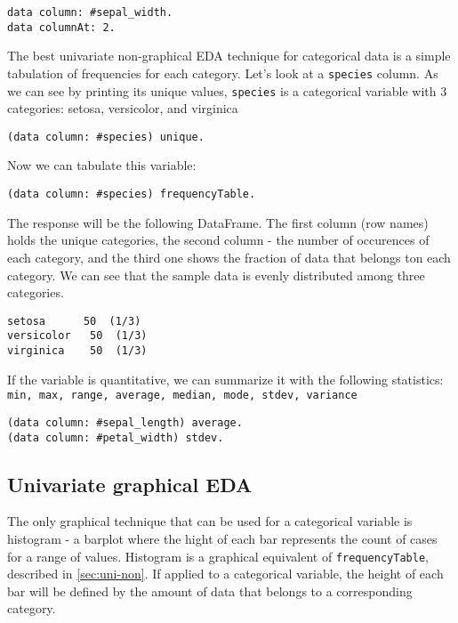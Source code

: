 \documentclass[sigplan]{acmart}
\begin{document}
\begin{lstlisting}[basicstyle=\small,language=Smalltalk]
data column: #sepal_width.
data columnAt: 2.
\end{lstlisting}

The best univariate non-graphical EDA technique for categorical data is a simple tabulation of frequencies for each category\cite{Seltman}. Let's look at a \texttt{species} column. As we can see by printing its unique values, \texttt{species} is a categorical variable with 3 categories: setosa, versicolor, and virginica

\begin{lstlisting}[basicstyle=\small,language=Smalltalk]
(data column: #species) unique.
\end{lstlisting}

Now we can tabulate this variable:

\begin{lstlisting}[basicstyle=\small,language=Smalltalk]
(data column: #species) frequencyTable.
\end{lstlisting}

The response will be the following DataFrame. The first column (row names) holds the unique categories, the second column - the number of occurences of each category, and the third one shows the fraction of data that belongs ton each category. We can see that the sample data is evenly distributed among three categories.

\begin{lstlisting}[basicstyle=\small,language=Smalltalk]
setosa      50  (1/3)
versicolor   50  (1/3)
virginica    50  (1/3)
\end{lstlisting}

If the variable is quantitative, we can summarize it with the following statistics: \texttt{min, max, range, average, median, mode, stdev, variance}

\begin{lstlisting}[basicstyle=\small,language=Smalltalk]
(data column: #sepal_length) average. 
(data column: #petal_width) stdev.
\end{lstlisting}

\subsection{Univariate graphical EDA}
\label{sec:uni-graph}

The only graphical technique that can be used for a categorical variable is histogram - a barplot where the hight of each bar represents the count of cases for a range of values. Histogram is a graphical equivalent of \texttt{frequencyTable}, described in \ref{sec:uni-non}. If applied to a categorical variable, the height of each bar will be defined by the amount of data that belongs to a corresponding category.
\end{document}
